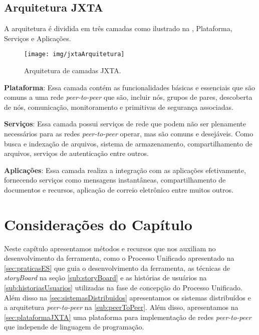 \subsection{Arquitetura JXTA}\label{sub:arquiteturaJXTA}
 A arquitetura é dividida em três camadas como ilustrado na , Plataforma, Serviços e Aplicações.
 \begin{figure}[htb]
 	\caption{Arquitetura de camadas JXTA.}\label{fig:jxtaArquitetura}
 	\begin{center}
 		\texttt{[image: img/jxtaArquitetura]}
 	\end{center}
 \end{figure}
 
\textbf{Plataforma}: Essa camada contém as funcionalidades básicas e essenciais que são comuns a uma rede \textit{peer-to-peer} que são,  incluir nós, grupos de pares, descoberta de nós, comunicação, monitoramento e primitivas de segurança associadas.\cite{juniorcompartilhamento, jxta2015}

\textbf{Serviços}: Essa camada possui serviços de rede que podem não ser plenamente necessários para as redes \textit{peer-to-peer} operar, mas são comuns e desejáveis. Como busca e indexação de arquivos, sistema de armazenamento, compartilhamento de arquivos, serviços de autenticação entre outros.\cite{juniorcompartilhamento, jxta2015}

\textbf{Aplicações}: Essa camada realiza a integração com as aplicações efetivamente, fornecendo serviços como mensagens instantâneas, compartilhamento de documentos e recursos, aplicação de correio eletrônico entre muitos outros.\cite{juniorcompartilhamento, jxta2015}
\section{Considerações do Capítulo}\label{sec:conclusaoMetodosRecursos}
Neste capítulo apresentamos métodos e recursos que nos auxiliam no desenvolvimento da ferramenta, como o Processo Unificado apresentado na \autoref{sec:praticasES} que guia o desenvolvimento da ferramenta, as técnicas de \textit{storyBoard} na seção \autoref{sub:storyBoard} e as histórias de usuários na \autoref{sub:historiasUsuarios} utilizadas na fase de concepção do Processo Unificado. Além disso na \autoref{sec:sistemasDistribuidos} apresentamos os sistemas distribuídos e a arquitetura \textit{peer-to-peer} na \autoref{sub:peerToPeer}. Além disso, apresentamos na \autoref{sec:plataformaJXTA} uma plataforma para implementação de redes \textit{peer-to-peer} que independe de linguagem de programação.

